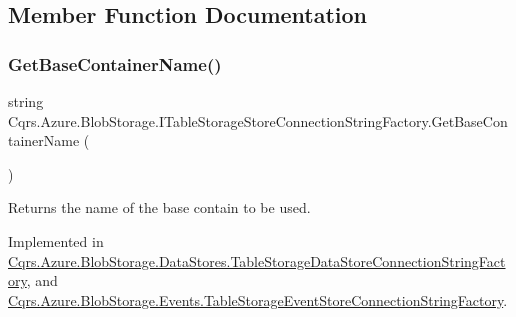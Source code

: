 \subsection{Member Function Documentation}
\mbox{\label{interfaceCqrs_1_1Azure_1_1BlobStorage_1_1ITableStorageStoreConnectionStringFactory_a1b9bfc9dcb7292e62619fc46e4a85982_a1b9bfc9dcb7292e62619fc46e4a85982}} 
\subsubsection{\texorpdfstring{Get\+Base\+Container\+Name()}{GetBaseContainerName()}}
{\footnotesize\ttfamily string Cqrs.\+Azure.\+Blob\+Storage.\+I\+Table\+Storage\+Store\+Connection\+String\+Factory.\+Get\+Base\+Container\+Name (\begin{DoxyParamCaption}{ }\end{DoxyParamCaption})}



Returns the name of the base contain to be used. 



Implemented in \hyperlink{classCqrs_1_1Azure_1_1BlobStorage_1_1DataStores_1_1TableStorageDataStoreConnectionStringFactory_a03239d850e3fd95cd1507780425a7c94_a03239d850e3fd95cd1507780425a7c94}{Cqrs.\+Azure.\+Blob\+Storage.\+Data\+Stores.\+Table\+Storage\+Data\+Store\+Connection\+String\+Factory}, and \hyperlink{classCqrs_1_1Azure_1_1BlobStorage_1_1Events_1_1TableStorageEventStoreConnectionStringFactory_a118388598a7fa653122fc11521c915d7_a118388598a7fa653122fc11521c915d7}{Cqrs.\+Azure.\+Blob\+Storage.\+Events.\+Table\+Storage\+Event\+Store\+Connection\+String\+Factory}.

